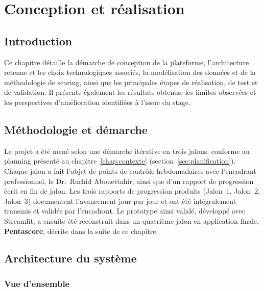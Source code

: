 \chapter{Conception et réalisation}
\label{chap:conception}

\section*{Introduction}

Ce chapitre détaille la démarche de conception de la plateforme, l'architecture retenue et les choix technologiques associés, la modélisation des données et de la méthodologie de scoring, ainsi que les principales étapes de réalisation, de test et de validation. Il présente également les résultats obtenus, les limites observées et les perspectives d'amélioration identifiées à l'issue du stage.

\section{Méthodologie et démarche}
\label{sec:methodologie}

\hspace{1cm}Le projet a été mené selon une démarche itérative en trois jalons, conforme au planning présenté au chapitre~\ref{chap:contexte} (section~\ref{sec:planification}). Chaque jalon a fait l'objet de points de contrôle hebdomadaires avec l'encadrant professionnel, le Dr.~Rachid Abouettahir, ainsi que d'un rapport de progression écrit en fin de jalon. Les trois rapports de progression produits (Jalon~1, Jalon~2, Jalon~3) documentent l'avancement jour par jour et ont été intégralement transmis et validés par l'encadrant. Le prototype ainsi validé, développé avec Streamlit, a ensuite été reconstruit dans un quatrième jalon en application finale, \textbf{Pentascore}, décrite dans la suite de ce chapitre.

\section{Architecture du système}
\label{sec:architecture}

\subsection{Vue d'ensemble}


